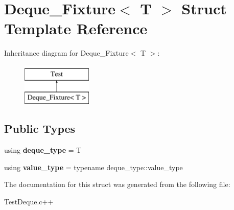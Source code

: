 \hypertarget{structDeque__Fixture}{\section{Deque\-\_\-\-Fixture$<$ T $>$ Struct Template Reference}
\label{structDeque__Fixture}
}
Inheritance diagram for Deque\-\_\-\-Fixture$<$ T $>$\-:\begin{figure}[H]
\begin{center}
\leavevmode
\includegraphics[height=2.000000cm]{structDeque__Fixture}
\end{center}
\end{figure}
\subsection*{Public Types}
\begin{DoxyCompactItemize}
\item 
\hypertarget{structDeque__Fixture_a6fabab0c403e8ade3919ec1fc0317f34}{using {\bfseries deque\-\_\-type} = T}\label{structDeque__Fixture_a6fabab0c403e8ade3919ec1fc0317f34}

\item 
\hypertarget{structDeque__Fixture_a29af621048a973fc8b4f4365933e6fda}{using {\bfseries value\-\_\-type} = typename deque\-\_\-type\-::value\-\_\-type}\label{structDeque__Fixture_a29af621048a973fc8b4f4365933e6fda}

\end{DoxyCompactItemize}


The documentation for this struct was generated from the following file\-:\begin{DoxyCompactItemize}
\item 
Test\-Deque.\-c++\end{DoxyCompactItemize}
